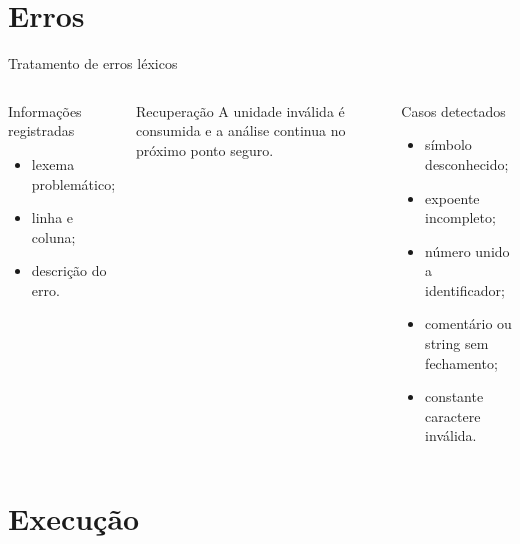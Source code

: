 \documentclass[aspectratio=169,11pt]{beamer}
\begin{document}
\section{Erros}

\begin{frame}{Tratamento de erros léxicos}
  \begin{columns}[T,onlytextwidth]
      \begin{block}{Informações registradas}
        \begin{itemize}
          \item lexema problemático;
          \item linha e coluna;
          \item descrição do erro.
        \end{itemize}
      \end{block}

      \begin{alertblock}{Recuperação}
        A unidade inválida é consumida e a análise continua no próximo ponto seguro.
      \end{alertblock}

      \begin{block}{Casos detectados}
        \begin{itemize}
          \item símbolo desconhecido;
          \item expoente incompleto;
          \item número unido a identificador;
          \item comentário ou string sem fechamento;
          \item constante caractere inválida.
        \end{itemize}
      \end{block}
  \end{columns}
\end{frame}

\section{Execução}
\end{document}
